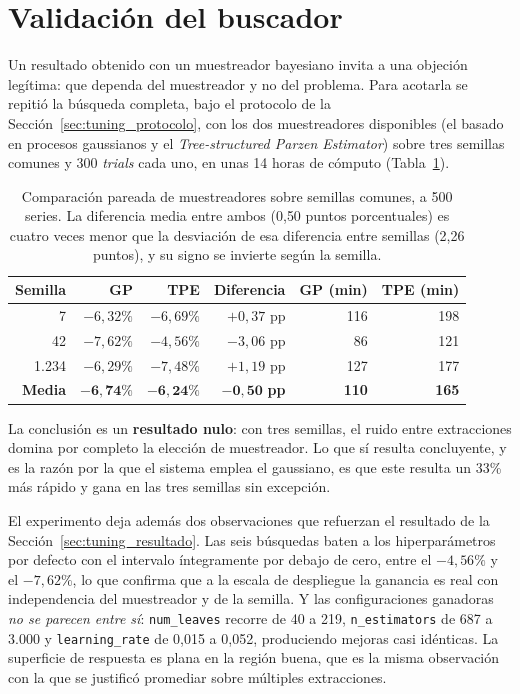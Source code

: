 \section{Validación del buscador}

Un resultado obtenido con un muestreador bayesiano invita a una objeción legítima: que dependa
del muestreador y no del problema. Para acotarla se repitió la búsqueda completa, bajo el
protocolo de la Sección~\ref{sec:tuning_protocolo}, con los dos muestreadores disponibles (el
basado en procesos gaussianos y el \textit{Tree-structured Parzen Estimator}) sobre tres semillas
comunes y 300 \textit{trials} cada uno, en unas 14 horas de cómputo
(Tabla~\ref{tab:tuning_samplers}).

\begin{table}[htbp]
    \centering
    \small
    \begin{tabular}{rrrrrr}
        \toprule
        \textbf{Semilla} & \textbf{GP} & \textbf{TPE} & \textbf{Diferencia} & \textbf{GP (min)} & \textbf{TPE (min)} \\
        \midrule
        7 & $-6{,}32\%$ & $-6{,}69\%$ & $+0{,}37$ pp & 116 & 198 \\
        42 & $-7{,}62\%$ & $-4{,}56\%$ & $-3{,}06$ pp & 86 & 121 \\
        1.234 & $-6{,}29\%$ & $-7{,}48\%$ & $+1{,}19$ pp & 127 & 177 \\
        \midrule
        \textbf{Media} & $\mathbf{-6{,}74\%}$ & $\mathbf{-6{,}24\%}$ & $\mathbf{-0{,}50}$ \textbf{pp} & \textbf{110} & \textbf{165} \\
        \bottomrule
    \end{tabular}
    \caption[Comparación pareada de muestreadores]{Comparación pareada de muestreadores sobre semillas comunes, a 500 series. La
    diferencia media entre ambos (0{,}50 puntos porcentuales) es cuatro veces menor que la
    desviación de esa diferencia entre semillas (2{,}26 puntos), y su signo se invierte según la
    semilla.}
    \label{tab:tuning_samplers}
\end{table}

La conclusión es un \textbf{resultado nulo}: con tres semillas, el ruido entre extracciones domina
por completo la elección de muestreador. Lo que sí resulta concluyente, y es la razón por la que
el sistema emplea el gaussiano, es que este resulta un 33\% más rápido y gana en las tres semillas
sin excepción.

El experimento deja además dos observaciones que refuerzan el resultado de la
Sección~\ref{sec:tuning_resultado}. Las seis búsquedas baten a los hiperparámetros por defecto
con el intervalo íntegramente por debajo de cero, entre el $-4{,}56\%$ y el $-7{,}62\%$, lo que
confirma que a la escala de despliegue la ganancia es real con independencia del muestreador y de
la semilla. Y las configuraciones ganadoras \emph{no se parecen entre sí}: \texttt{num\_leaves}
recorre de 40 a 219, \texttt{n\_estimators} de 687 a 3.000 y \texttt{learning\_rate} de 0{,}015 a
0{,}052, produciendo mejoras casi idénticas. La superficie de respuesta es plana en la región
buena, que es la misma observación con la que se justificó promediar sobre múltiples
extracciones.


